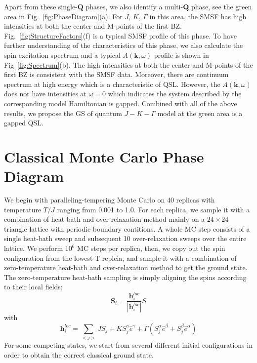 \documentclass[aps,prb,reprint,amsfonts,amsmath,amssymb,showpacs,groupedaddress,superscriptaddress]{revtex4-1}
\begin{document}
Apart from these single-$\mathbf{Q}$ phases, we also identify a multi-$\mathbf{Q}$ phase, see the green area in Fig.~\ref{fig:PhaseDiagram}(a). For $J$, $K$, $\Gamma$ in this area, the SMSF has high intensities at both the center and M-points of the first BZ. Fig.~\ref{fig:StructureFactors}(f) is a typical SMSF profile of this phase. To have further understanding of the characteristics of this phase, we also calculate the spin excitation spectrum and a typical $A(\mathbf{k}, \omega)$ profile is shown in Fig~\ref{fig:Spectrum}(b). The high intensities at both the center and M-points of the first BZ is consistent with the SMSF data. Moreover, there are continuum spectrum at high energy which is a characteristic of QSL. However, the $A(\mathbf{k}, \omega)$ does not have intensities at $\omega = 0$ which indicates the system described by the corresponding model Hamiltonian is gapped. Combined with all of the above results, we propose the GS of quantum $J-K-\Gamma$ model at the green area is a gapped QSL.

\section{\label{sec:SectionV}Classical Monte Carlo Phase Diagram}
We begin with paralleling-tempering Monte Carlo \cite{JPSJ.65.1604} on 40 replicas with temperature $T/J$ ranging from 0.001 to 1.0. For each replica, we sample it with a combination of heat-bath \cite{Miyatake_1986} and over-relaxation method \cite{Berg2004MarkovCM} mainly on a $24 \times 24$ triangle lattice with periodic boundary contitions. A whole MC step consists of a single heat-bath sweep and subsequent 10 over-relaxation sweeps over the entire lattice. We perform $10^6$ MC steps per replica, then, we copy out the spin configuration from the lowest-T replcia, and sample it with a combination of zero-temperature heat-bath and over-relaxation method to get the ground state. The zero-temperature heat-bath sampling is simply aligning the spins according to their local fields:
\begin{equation}
    \mathbf{S}_i = \frac{\mathbf{h}_i^{loc}}{|\mathbf{h}_i^{loc}|}S
\end{equation}
with
\begin{equation}
    \mathbf{h}_i^{loc} = \sum_{<j>} JS_j + KS_j^{\gamma}\hat{e}^{\gamma} + \Gamma (S_j^{\alpha}\hat{e}^{\beta} + S_j^{\beta}\hat{e}^{\alpha})
\end{equation}
For some competing states, we start from several different initial configurations in order to obtain the correct classical ground state.
\end{document}

